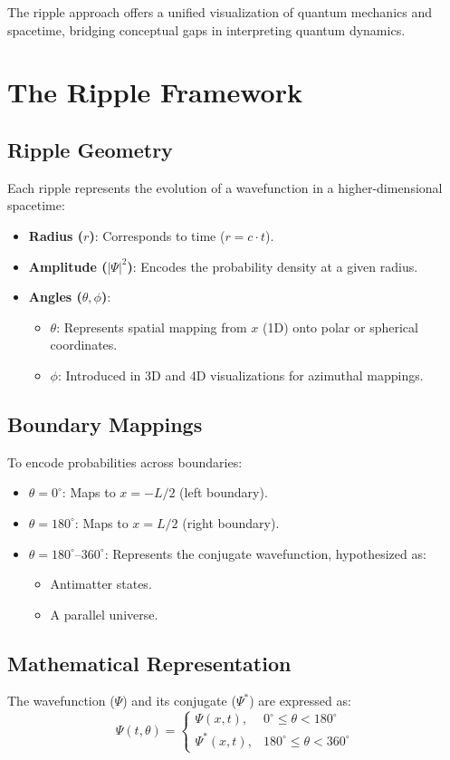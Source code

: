 \documentclass[12pt]{article}
\begin{document}
The ripple approach offers a unified visualization of quantum mechanics and spacetime, bridging conceptual gaps in interpreting quantum dynamics.

\section{The Ripple Framework}
\subsection{Ripple Geometry}
Each ripple represents the evolution of a wavefunction in a higher-dimensional spacetime:
\begin{itemize}
    \item \textbf{Radius (\(r\))}: Corresponds to time (\( r = c \cdot t \)).
    \item \textbf{Amplitude (\(|\Psi|^2\))}: Encodes the probability density at a given radius.
    \item \textbf{Angles (\(\theta, \phi\))}:
    \begin{itemize}
        \item \(\theta\): Represents spatial mapping from \(x\) (1D) onto polar or spherical coordinates.
        \item \(\phi\): Introduced in 3D and 4D visualizations for azimuthal mappings.
    \end{itemize}
\end{itemize}

\subsection{Boundary Mappings}
To encode probabilities across boundaries:
\begin{itemize}
    \item \(\theta = 0^\circ\): Maps to \(x = -L/2\) (left boundary).
    \item \(\theta = 180^\circ\): Maps to \(x = L/2\) (right boundary).
    \item \(\theta = 180^\circ\)–\(360^\circ\): Represents the conjugate wavefunction, hypothesized as:
    \begin{itemize}
        \item Antimatter states.
        \item A parallel universe.
    \end{itemize}
\end{itemize}

\subsection{Mathematical Representation}
The wavefunction (\(\Psi\)) and its conjugate (\(\Psi^*\)) are expressed as:
\begin{equation}
\Psi(t, \theta) =
\begin{cases} 
\Psi(x, t), & 0^\circ \leq \theta < 180^\circ \\
\Psi^*(x, t), & 180^\circ \leq \theta < 360^\circ 
\end{cases}
\end{equation}
\end{document}
